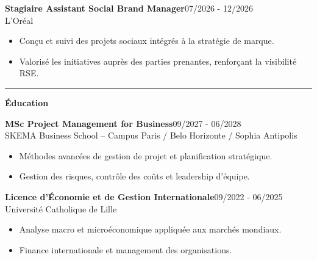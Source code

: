 \documentclass[a4paper]{article}
\renewcommand{\colorbox}[2]{#2}%
\newcommand{\fullrule}{\hspace{-1.5cm}\rule{\paperwidth}{0.4pt}}
\newcommand{\cvsection}[1]{%
  \vspace{6pt}\textbf{\Large #1}\par\vspace{2pt}}
\begin{document}
\colorbox{maincolor}{%
  \begin{minipage}{\linewidth}
    \noindent
    \textbf{Stagiaire Assistant Social Brand Manager}\hfill 07/2026 - 12/2026\\
    L’Oréal\\[-0.3em]
    \begin{itemize}[leftmargin=*]
      \item Conçu et suivi des projets sociaux intégrés à la stratégie de marque. \item Valorisé les initiatives auprès des parties prenantes, renforçant la visibilité RSE.
    \end{itemize}
  \end{minipage}}

\medskip\fullrule

\cvsection{Éducation}
\vspace{0.3cm}

\colorbox{maincolor}{%
  \begin{minipage}{\linewidth}
    \noindent
    \textbf{MSc Project Management for Business}\hfill 09/2027 - 06/2028\\
    SKEMA Business School – Campus Paris / Belo Horizonte / Sophia Antipolis\\[-0.3em]
    \begin{itemize}[leftmargin=*]
      \item Méthodes avancées de gestion de projet et planification stratégique. \item Gestion des risques, contrôle des coûts et leadership d’équipe.
    \end{itemize}
  \end{minipage}}

\vspace{3mm}

\colorbox{maincolor}{%
  \begin{minipage}{\linewidth}
    \noindent
    \textbf{Licence d’Économie et de Gestion Internationale}\hfill 09/2022 - 06/2025\\
    Université Catholique de Lille\\[-0.3em]
    \begin{itemize}[leftmargin=*]
      \item Analyse macro et microéconomique appliquée aux marchés mondiaux. \item Finance internationale et management des organisations.
    \end{itemize}
  \end{minipage}}
\end{document}
